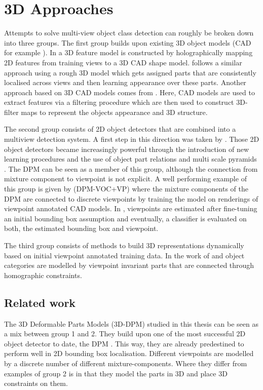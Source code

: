 \section{3D Approaches}
Attempts to solve multi-view object class detection can roughly be broken down into three groups. 
The first group builds upon existing 3D object models (CAD for example \cite{flynn1989cad}). In \cite{yan20073d} a 3D feature model is constructed by holographically mapping 2D features from training views to a 3D CAD shape model. \cite{4270070} follows a similar approach using a rough 3D model which gets assigned parts that are consistently localised across views and then learning appearance over these parts. 
Another approach based on 3D CAD models comes from \cite{liebelt2008viewpoint}. Here, CAD models are used to extract features via a filtering procedure which are then used to construct 3D-filter maps to represent the objects appearance and 3D structure. 

The second group consists of 2D object detectors that are combined into a multiview detection system. A first step in this direction was taken by \cite{thomas2006towards}. Those 2D object detectors became increasingly powerful through the introduction of new learning procedures and  the use of object part relations and multi scale pyramids \cite{felzenszwalb2008discriminatively}. The DPM \cite{5255236} can be seen as a member of this group, although the connection from mixture component to viewpoint is not explicit. A well performing example of this group is given by \cite{6248075} (DPM-VOC+VP) where the mixture components of the DPM are connected to discrete viewpoints by training the model on renderings of viewpoint annotated CAD models. In \cite{5206633}, viewpoints are estimated after fine-tuning an initial bounding box assumption and eventually, a classifier is evaluated on both, the estimated bounding box and viewpoint. 

The third group consists of methods to build 3D representations dynamically based on initial viewpoint annotated training data. In the work of  \cite{4408987} and \cite{savarese2008view} object categories are modelled by viewpoint invariant parts that are connected through homographic constraints. 

\subsection{Related work}

The 3D Deformable Parts Models (3D-DPM) studied in this thesis can be seen as a mix between group 1 and 2. They build upon one of the most successful 2D object detector to date, the DPM \cite{5255236}. This way, they are already predestined to perform well in 2D bounding box localisation. Different viewpoints are modelled by a discrete number of different mixture-components. Where they differ from examples of group 2 is in that  they model the parts in 3D and place 3D constraints on them. 

